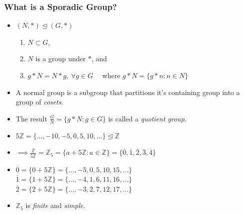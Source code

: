 \documentclass{beamer}
\begin{document}
\begin{frame}
    \frametitle{What is a Sporadic Group?}
    \begin{itemize}
        \item<2-> \( (N,*) \unlhd (G,*) \) 
            \begin{enumerate}
                \item<3-> \( N \subset G \), 
                \item<4-> \( N \) is a group under \( * \), and 
                \item<5-> \( g * N = N * g, \ \forall g \in G  \) 
                    \ \ where \( g * N = \{g * n : n \in N \} \)
            \end{enumerate}
        \item<6-> A normal group is a subgroup that partitions it's containing group into 
            a group of \textit{cosets}.
        \item<7-> The result \( \frac{G}{N} = \{g * N : g \in G \}\) is called a \textit{quotient group}.
        \item<8->
            \begin{example} 
            \end{example}
            \( 5\mathbb{Z} = \{..., -10, -5, 0, 5, 10, ...\} \unlhd \mathbb{Z} \)
        \item<9-> \( \implies \frac{\mathbb{Z}}{5\mathbb{Z}} 
            = \mathbb{Z}_5 = \{ a + 5\mathbb{Z} : a \in \mathbb{Z} \} 
            = \{ \overline{0}, \overline{1}, \overline{2}, \overline{3}, \overline{4} \}\)
        \item<10-> \( \overline{0} = \{ 0 + 5\mathbb{Z}\} = \{..., -5, 0, 5, 10, 15, ... \}\)\\
         \( \overline{1} = \{ 1 + 5\mathbb{Z}\} = \{..., -4, 1, 6, 11, 16, ...\} \)\\
         \( \overline{2} = \{ 2 + 5\mathbb{Z}\} = \{..., -3, 2, 7, 12, 17, ...\} \)\\
        \item<11-> \( \mathbb{Z}_5 \) is \textit{finite} and \textit{simple}.
    \end{itemize}
\end{frame}
\end{document}
